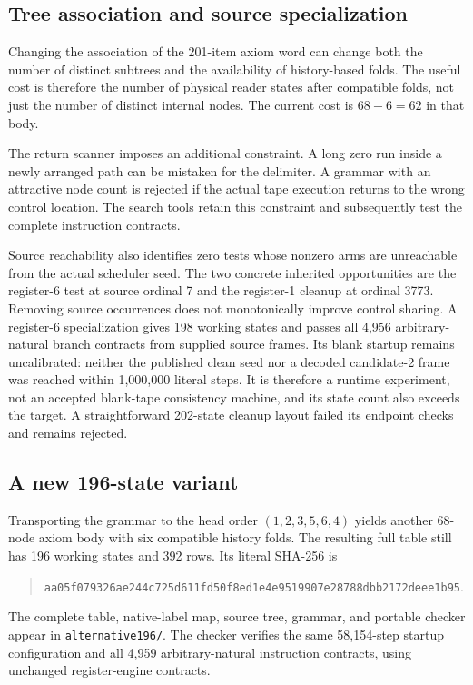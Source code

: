 \documentclass[11pt,letterpaper]{article}
\newcommand{\file}[1]{\texttt{\nolinkurl{#1}}}
\begin{document}
\subsection{Tree association and source specialization}

Changing the association of the 201-item axiom word can change both the
number of distinct subtrees and the availability of history-based folds.
The useful cost is therefore the number of physical reader states after
compatible folds, not just the number of distinct internal nodes. The
current cost is $68-6=62$ in that body.

The return scanner imposes an additional constraint. A long zero run
inside a newly arranged path can be mistaken for the delimiter. A grammar
with an attractive node count is rejected if the actual tape execution
returns to the wrong control location. The search tools retain this
constraint and subsequently test the complete instruction contracts.

Source reachability also identifies zero tests whose nonzero arms are
unreachable from the actual scheduler seed. The two concrete inherited
opportunities are the register-6 test at source ordinal 7 and the
register-1 cleanup at ordinal 3773. Removing source occurrences does not
monotonically improve control sharing. A register-6 specialization gives
198 working states and passes all 4,956 arbitrary-natural branch contracts
from supplied source frames. Its blank startup remains uncalibrated:
neither the published clean seed nor a decoded candidate-2 frame was
reached within 1,000,000 literal steps. It is therefore a runtime
experiment, not an accepted blank-tape consistency machine, and its state
count also exceeds the target. A straightforward 202-state cleanup layout
failed its endpoint checks and remains rejected.

\subsection{A new 196-state variant}
\label{sec:alternative}

Transporting the grammar to the head order $(1,2,3,5,6,4)$ yields another
68-node axiom body with six compatible history folds. The resulting full
table still has 196 working states and 392 rows. Its literal SHA-256 is
\begin{quote}\small
\nolinkurl{aa05f079326ae244c725d611fd50f8ed1e4e9519907e28788dbb2172deee1b95}.
\end{quote}
The complete table, native-label map, source tree, grammar, and portable
checker appear in \file{alternative196/}. The checker verifies the same
58,154-step startup configuration and all 4,959 arbitrary-natural
instruction contracts, using unchanged register-engine contracts.
\end{document}
